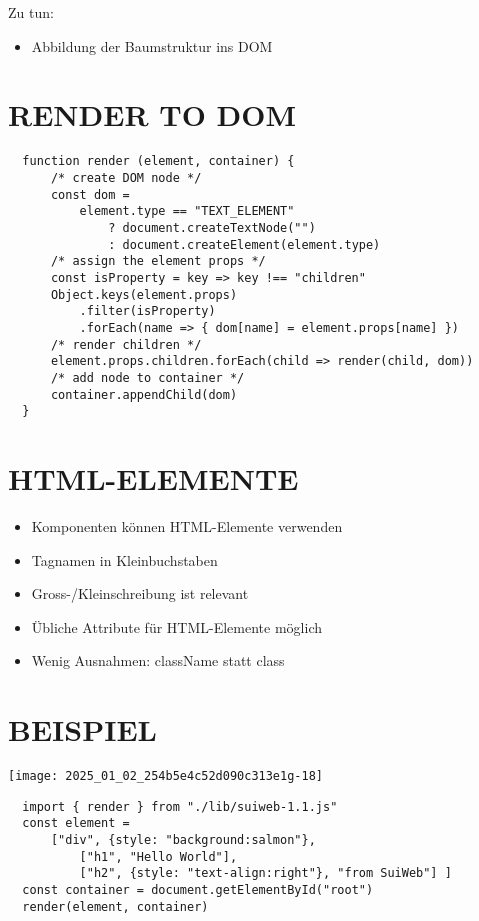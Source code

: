   Zu tun:
  
  \begin{itemize}
    \item Abbildung der Baumstruktur ins DOM
  \end{itemize}
  
  \section*{RENDER TO DOM}
  \begin{verbatim}
  function render (element, container) {
      /* create DOM node */
      const dom =
          element.type == "TEXT_ELEMENT"
              ? document.createTextNode("")
              : document.createElement(element.type)
      /* assign the element props */
      const isProperty = key => key !== "children"
      Object.keys(element.props)
          .filter(isProperty)
          .forEach(name => { dom[name] = element.props[name] })
      /* render children */
      element.props.children.forEach(child => render(child, dom))
      /* add node to container */
      container.appendChild(dom)
  }
  \end{verbatim}
  
  \section*{HTML-ELEMENTE}
  \begin{itemize}
    \item Komponenten können HTML-Elemente verwenden
    \item Tagnamen in Kleinbuchstaben
    \item Gross-/Kleinschreibung ist relevant
    \item Übliche Attribute für HTML-Elemente möglich
    \item Wenig Ausnahmen: className statt class
  \end{itemize}
  
  \section*{BEISPIEL}
  \begin{center}
  \texttt{[image: 2025\_01\_02\_254b5e4c52d090c313e1g-18]}
  \end{center}
  
  \begin{verbatim}
  import { render } from "./lib/suiweb-1.1.js"
  const element =
      ["div", {style: "background:salmon"},
          ["h1", "Hello World"],
          ["h2", {style: "text-align:right"}, "from SuiWeb"] ]
  const container = document.getElementById("root")
  render(element, container)
  \end{verbatim}
  
